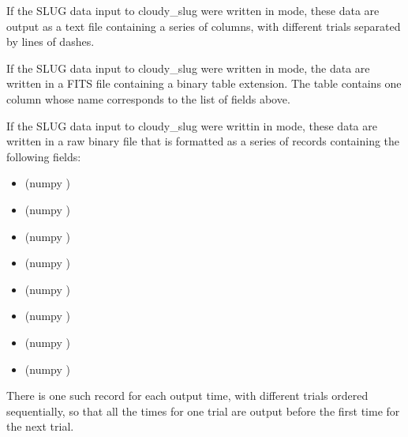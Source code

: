 \documentclass[letterpaper,10pt,english]{sphinxmanual}
\begin{document}
If the SLUG data input to cloudy\_slug were written in  mode,
these data are output as a text file containing a series of columns,
with different trials separated by lines of dashes.

If the SLUG data input to cloudy\_slug were written in  mode,
the data are written in a FITS file containing a binary table
extension. The table contains one column whose name corresponds to the
list of fields above.

If the SLUG data input to cloudy\_slug were writtin in  mode,
these data are written in a raw binary file that is formatted as a
series of records containing the following fields:
\begin{itemize}
\item {} 
 (numpy )

\item {} 
 (numpy )

\item {} 
 (numpy )

\item {} 
 (numpy )

\item {} 
 (numpy )

\item {} 
 (numpy )

\item {} 
 (numpy )

\item {} 
 (numpy )

\end{itemize}

There is one such record for each output time, with different trials ordered sequentially, so that all the times for one trial are output before the first time for the next trial.
\end{document}
